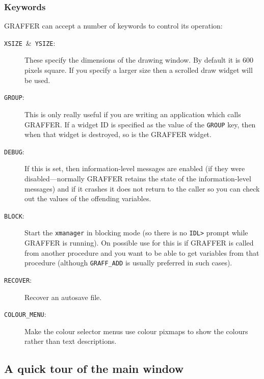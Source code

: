 \documentclass[11pt,twoside,english]{article}
\begin{document}
\subsubsection{Keywords}

GRAFFER can accept a number of keywords to control its operation:

\begin{description}

\item [\texttt{XSIZE}~\&~\texttt{YSIZE}:]These specify the dimensions
  of the drawing window. By default it is 600 pixels square. If you
  specify a larger size then a scrolled draw widget will be used.

\item [\texttt{GROUP}:]This is only really useful if you are writing an
  application which calls GRAFFER. If a widget ID is specified as the
  value of the \texttt{GROUP} key, then when that widget is destroyed,
  so is the GRAFFER widget.
\item [\texttt{DEBUG}:]If this is set, then information-level messages
  are enabled (if they were disabled---normally GRAFFER retains the
  state of the information-level messages) and if it crashes it does
  not return to the caller so you can check out the values of the
  offending variables.
\item[\texttt{BLOCK}:] Start the \texttt{xmanager} in blocking mode (so
  there is no \texttt{IDL>} prompt while GRAFFER is running). On
  possible use for this is if GRAFFER is called from another procedure
  and you want to be able to get variables from that procedure
  (although \texttt{GRAFF\_ADD} is usually preferred in such cases).
\item[\texttt{RECOVER}:] Recover an autosave file.
\item[\texttt{COLOUR\_MENU}:] Make the colour selector menus use colour
  pixmaps to show the colours rather than text descriptions.
\end{description}

\subsection{A quick tour of the main window}
\end{document}
